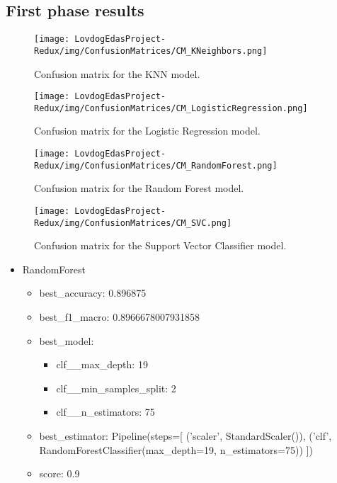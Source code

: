 \documentclass[10pt]{IEEEtran}
\begin{document}
\subsection{ First phase results }
\begin{figure}[!h]
  \centering
  \texttt{[image: LovdogEdasProject-Redux/img/ConfusionMatrices/CM\_KNeighbors.png]}
  \caption{Confusion matrix for the KNN model.}
\end{figure}
\begin{figure}[!h]
  \centering
  \texttt{[image: LovdogEdasProject-Redux/img/ConfusionMatrices/CM\_LogisticRegression.png]}
  \caption{Confusion matrix for the Logistic Regression model.}
\end{figure}
\begin{figure}[!h]
  \centering
  \texttt{[image: LovdogEdasProject-Redux/img/ConfusionMatrices/CM\_RandomForest.png]}
  \caption{Confusion matrix for the Random Forest model.}
\end{figure}
\begin{figure}[!h]
  \centering
  \texttt{[image: LovdogEdasProject-Redux/img/ConfusionMatrices/CM\_SVC.png]}
  \caption{Confusion matrix for the Support Vector Classifier model.}
\end{figure}

\begin{itemize}
  \item RandomForest
    \begin{itemize}
      \item best\_accuracy:    0.896875
      \item best\_f1\_macro:   0.8966678007931858
      \item best\_model:
        \begin{itemize}
         \item clf\_\_max\_depth: 19
         \item clf\_\_min\_samples\_split: 2
         \item clf\_\_n\_estimators: 75
        \end{itemize}
      \item best\_estimator: \newline
          Pipeline(steps=[\newline
          ('scaler', StandardScaler()),\newline
          ('clf', RandomForestClassifier(max\_depth=19, n\_estimators=75))\newline
          ])
      \item score:             0.9
  \end{itemize}
\end{itemize}
\end{document}
